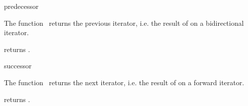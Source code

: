 

\begin{ccRefFunction}{predecessor}
  \label{sectionPredecessor}
  \label{sectionGenericFunctions}

  \ccDefinition The function \ccRefName\ returns the previous iterator,
  i.e. the result of  on a bidirectional iterator.
  
  
    {returns .}
  
  \ccSeeAlso
\end{ccRefFunction}

\begin{ccRefFunction}{successor}
  \label{sectionSuccessor}

  \ccDefinition The function \ccRefName\ returns the next iterator, i.e.
  the result of  on a forward iterator.
  
  
    {returns .}
  
  \ccSeeAlso
\end{ccRefFunction}

